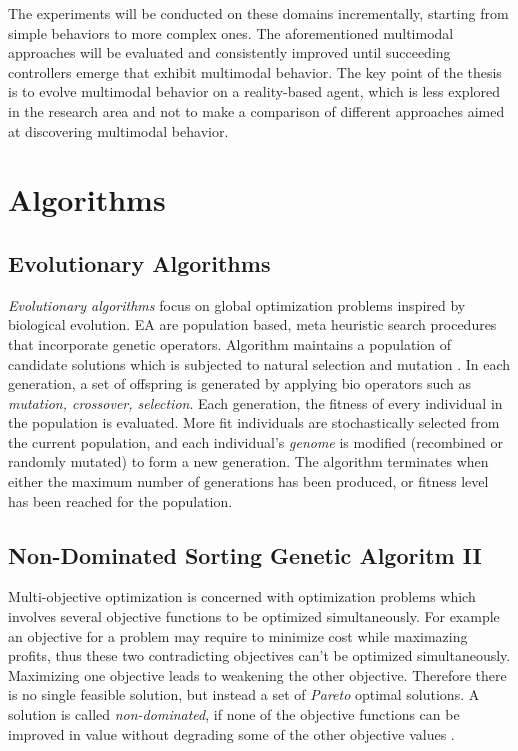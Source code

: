 \documentclass[format=acmsmall, review=false, screen=true]{acmart}
\begin{document}
The experiments will be conducted on these domains incrementally, starting from simple behaviors to more complex ones. The aforementioned multimodal approaches will be evaluated and consistently improved until succeeding controllers emerge that exhibit multimodal behavior. The key point of the thesis is to evolve multimodal behavior on a reality-based agent, which is less explored in the research area and not to make a comparison of different approaches aimed at discovering multimodal behavior.

\section{Algorithms}

\subsection{Evolutionary Algorithms}

\emph{Evolutionary algorithms} focus on global optimization problems inspired by biological evolution. EA are population based, meta heuristic search procedures that incorporate genetic operators. Algorithm maintains a population of candidate solutions which is subjected to natural selection and mutation \cite{back1996evolutionary}. In each generation, a set of offspring is generated by applying bio operators such as \emph{mutation, crossover, selection}. Each generation, the fitness of every individual in the population is evaluated. More fit individuals are stochastically selected from the current population, and each individual's \emph{genome} is modified (recombined or randomly mutated) to form a new generation. The algorithm terminates when either the maximum number of generations has been produced, or fitness level has been reached for the population.

\subsection{Non-Dominated Sorting Genetic Algoritm II}

Multi-objective optimization is concerned with optimization problems which involves several objective functions to be optimized simultaneously. For example an objective for a problem may require to minimize cost while maximazing profits, thus these two contradicting objectives can't be optimized simultaneously. Maximizing one objective leads to weakening the other objective. Therefore there is no single feasible solution, but instead a set of \emph{Pareto} optimal solutions.  A solution is called \emph{non-dominated}, if none of the objective functions can be improved in value without degrading some of the other objective values \cite{deb2014multi}.
\end{document}
